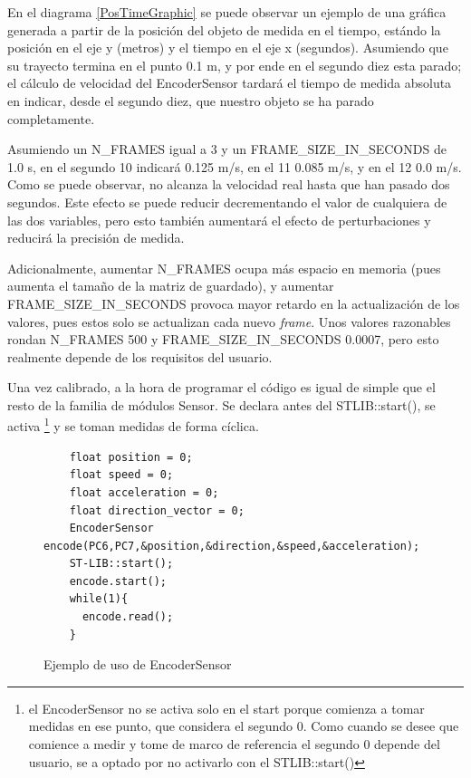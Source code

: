 \documentclass{report}
\begin{document}
\par \vspace{0.3cm}
En el diagrama \ref{PosTimeGraphic} se puede observar un ejemplo de una gráfica generada a partir de la posición del objeto de medida en el tiempo, estándo la posición en el eje y (metros) y el tiempo en el eje x (segundos). Asumiendo que su trayecto termina en el punto 0.1 m, y por ende en el segundo diez esta parado; el cálculo de velocidad del EncoderSensor tardará el tiempo de medida absoluta en indicar, desde el segundo diez, que nuestro objeto se ha parado completamente. \par
Asumiendo un N\_FRAMES igual a 3 y un FRAME\_SIZE\_IN\_SECONDS de 1.0 s, en el segundo 10 indicará 0.125 m/s, en el 11 0.085 m/s, y en el 12 0.0 m/s. Como se puede observar, no alcanza la velocidad real hasta que han pasado dos segundos. Este efecto se puede reducir decrementando el valor de cualquiera de las dos variables, pero esto también aumentará el efecto de perturbaciones y reducirá la precisión de medida. \par
Adicionalmente, aumentar N\_FRAMES ocupa más espacio en memoria (pues aumenta el tamaño de la matriz de guardado), y aumentar FRAME\_SIZE\_IN\_SECONDS provoca mayor retardo en la actualización de los valores, pues estos solo se actualizan cada nuevo \textit{frame}. Unos valores razonables rondan N\_FRAMES 500 y  FRAME\_SIZE\_IN\_SECONDS 0.0007, pero esto realmente depende de los requisitos del usuario. 
\par \vspace{0.3cm}
Una vez calibrado, a la hora de programar el código es igual de simple que el resto de la familia de módulos Sensor. Se declara antes del STLIB::start(), se activa \footnote{el EncoderSensor no se activa solo en el start porque comienza a tomar medidas en ese punto, que considera el segundo 0. Como cuando se desee que comience a medir y tome de marco de referencia el segundo 0 depende del usuario, se a optado por no activarlo con el STLIB::start()} y se toman medidas de forma cíclica. 
\begin{figure}[h]
  \begin{lstlisting}
    float position = 0;
    float speed = 0;
    float acceleration = 0;
    float direction_vector = 0;
    EncoderSensor encode(PC6,PC7,&position,&direction,&speed,&acceleration);
    ST-LIB::start();
    encode.start();
    while(1){
      encode.read();
    }
  \end{lstlisting}
  \caption{Ejemplo de uso de EncoderSensor}
  \label{EncoderSensorCode}
\end{figure}
\end{document}
